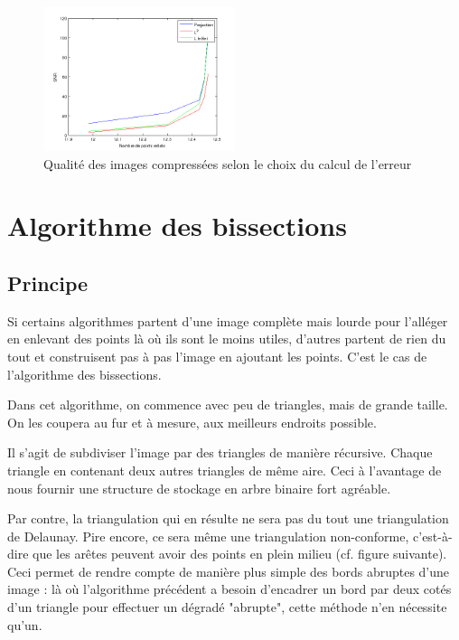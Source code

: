 \documentclass{report}
\begin{document}
\begin{figure}[ht]
\centering
\includegraphics[width=0.5\textwidth]{qualiteErr.png}
\caption{Qualité des images compressées selon le choix du calcul de l'erreur}
\end{figure}

\clearpage

\section{Algorithme des bissections}

\subsection{Principe}

Si certains algorithmes partent d'une image complète mais lourde pour l'alléger en enlevant des points là où ils sont le moins utiles, d'autres partent de rien du tout et construisent pas à pas l'image en ajoutant les points. C'est le cas de l'algorithme des bissections.

Dans cet algorithme, on commence avec peu de triangles, mais de grande taille. On les coupera au fur et à mesure, aux meilleurs endroits possible.

Il s'agit de subdiviser l'image par des triangles de manière récursive. Chaque triangle en contenant deux autres triangles de même aire. Ceci à l'avantage de nous fournir une structure de stockage en arbre binaire fort agréable. 

Par contre, la triangulation qui en résulte ne sera pas du tout une triangulation de Delaunay. Pire encore, ce sera même une triangulation non-conforme, c'est-à-dire que les arêtes peuvent avoir des points en plein milieu (cf. figure suivante). Ceci permet de rendre compte de manière plus simple des bords abruptes d'une image : là où l'algorithme précédent a besoin d'encadrer un bord par deux cotés d'un triangle pour effectuer un dégradé "abrupte", cette méthode n'en nécessite qu'un.
\end{document}
